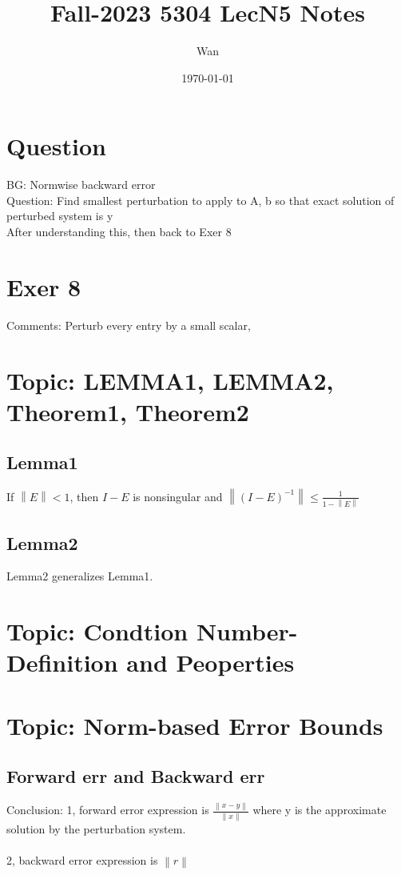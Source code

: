 \documentclass{article}
\begin{document}
\title{Fall-2023 5304 LecN5 Notes}
\author{Wan}
\date{\today}
\maketitle


\section{Question}
BG: Normwise backward error\\
Question: Find smallest perturbation to apply to A, b so that exact solution of perturbed system is y\\
After understanding this, then back to Exer 8


\section{Exer 8}

Comments:
Perturb every entry by a small scalar, 


\section{Topic: LEMMA1, LEMMA2, Theorem1, Theorem2}
\subsection*{Lemma1}
If $\left\lVert E\right\rVert < 1$, then $I-E$ is nonsingular and
$\left\lVert(I-E)^{-1} \right\rVert \leq \frac{1}{1-\left\lVert E\right\rVert }$

\subsection*{Lemma2}
Lemma2 generalizes Lemma1.


\section{Topic: Condtion Number-Definition and Peoperties}


\section{Topic: Norm-based Error Bounds}
\subsection*{Forward err and Backward err}
Conclusion:
1, forward error expression is $\frac{\left\lVert x-y\right\rVert}{\left\lVert x\right\rVert}$ where y is the approximate solution by the perturbation system.\\
\\
2, backward error expression is $\left\lVert r\right\rVert $
\end{document}
